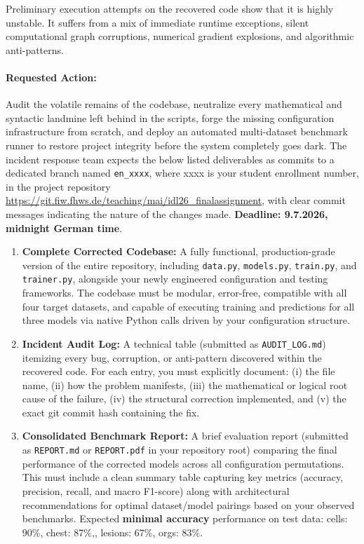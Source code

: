 \documentclass[11pt,a4paper]{article}
\begin{document}
Preliminary execution attempts on the recovered code show that it is highly unstable. It suffers from a mix of immediate runtime exceptions, silent computational graph corruptions, numerical gradient explosions, and algorithmic anti-patterns. 

\vspace{-0.4cm}
\paragraph{Requested Action:} Audit the volatile remains of the codebase, neutralize every mathematical and syntactic landmine left behind in the scripts, forge the missing configuration infrastructure from scratch, and deploy an automated multi-dataset benchmark runner to restore project integrity before the system completely goes dark. The incident response team expects the below listed deliverables as commits to a dedicated branch named \texttt{en\_xxxx}, where xxxx is your student enrollment number, in the project repository \url{https://git.fiw.fhws.de/teaching/mai/idl26_finalassignment}, with clear commit messages indicating the nature of the changes made. \textbf{Deadline: 9.7.2026, midnight German time}. 
\begin{enumerate}
    \item \textbf{Complete Corrected Codebase:} A fully functional, production-grade version of the entire repository, including \texttt{data.py}, \texttt{models.py}, \texttt{train.py}, and \texttt{trainer.py}, alongside your newly engineered configuration and testing frameworks. The codebase must be modular, error-free, compatible with all four target datasets, and capable of executing training and predictions for all three models via native Python calls driven by your configuration structure.
    \item \textbf{Incident Audit Log:} A technical table (submitted as \texttt{AUDIT\_LOG.md}) itemizing every bug, corruption, or anti-pattern discovered within the recovered code. For each entry, you must explicitly document: (i) the file name, (ii) how the problem manifests, (iii) the mathematical or logical root cause of the failure, (iv) the structural correction implemented, and (v) the exact git commit hash containing the fix.
    \item \textbf{Consolidated Benchmark Report:} A brief evaluation report (submitted as \texttt{REPORT.md} or \texttt{REPORT.pdf} in your repository root) comparing the final performance of the corrected models across all configuration permutations. This must include a clean summary table capturing key metrics (accuracy, precision, recall, and macro F1-score) along with architectural recommendations for optimal dataset/model pairings based on your observed benchmarks. Expected \textbf{minimal accuracy} performance on test data: cells: 90\%, chest: 87\%,, lesions: 67\%, orgs: 83\%.
\end{enumerate}
\end{document}
